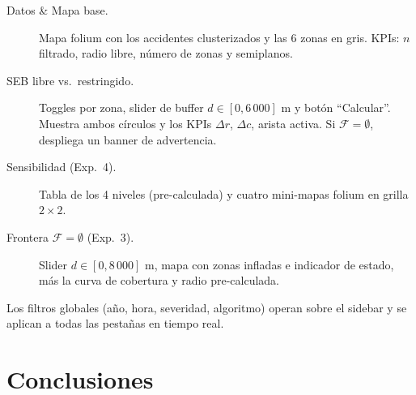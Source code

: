 \documentclass[11pt,a4paper]{article}
\theoremstyle{definition}
\theoremstyle{remark}
\newcommand{\FF}{\mathcal{F}}
\begin{document}
\begin{description}
  \item[Datos \& Mapa base.] Mapa folium con los accidentes clusterizados y
    las 6 zonas en gris.  KPIs: $n$ filtrado, radio libre, número de zonas
    y semiplanos.
  \item[SEB libre vs.\ restringido.] Toggles por zona, slider de buffer
    $d \in [0, 6\,000]$ m y botón ``Calcular''.  Muestra ambos círculos y
    los KPIs $\Delta r$, $\Delta c$, arista activa.  Si $\FF = \emptyset$,
    despliega un banner de advertencia.
  \item[Sensibilidad (Exp.\ 4).] Tabla de los 4 niveles (pre-calculada) y
    cuatro mini-mapas folium en grilla $2 \times 2$.
  \item[Frontera $\FF = \emptyset$ (Exp.\ 3).] Slider $d \in [0, 8\,000]$ m,
    mapa con zonas infladas e indicador de estado, más la curva de cobertura
    y radio pre-calculada.
\end{description}

Los filtros globales (año, hora, severidad, algoritmo) operan sobre el sidebar
y se aplican a todas las pestañas en tiempo real.

\section{Conclusiones}
\label{sec:conclusions}
\end{document}
